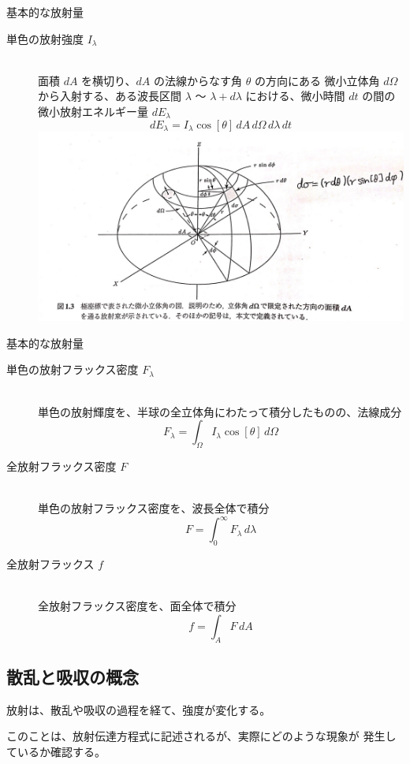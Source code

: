 \documentclass[unicode,colorlinks]{beamer}
\begin{document}
\begin{frame}{基本的な放射量}
	\begin{description}
		\item[単色の放射強度 $I_\lambda$]\leavevmode\\
			面積 $dA$ を横切り、$dA$ の法線からなす角 $\theta$ の方向にある
			微小立体角 $d\Omega$ から入射する、ある波長区間 $\lambda$ 〜
			$\lambda+d\lambda$ における、微小時間 $dt$ の間の微小放射エネルギー量
			$dE_\lambda$
			\[dE_\lambda=I_\lambda\cos[\theta]\,dA\,d\Omega\,d\lambda\,dt\]
			\includegraphics[width=\linewidth]{eq.jpg}
	\end{description}
\end{frame}

\begin{frame}{基本的な放射量}
	\begin{description}
		\item[単色の放射フラックス密度 $F_\lambda$]\leavevmode\\
			単色の放射輝度を、半球の全立体角にわたって積分したものの、法線成分
			\[F_\lambda=\int_\Omega I_\lambda\cos[\theta]\,d\Omega\]
		\item[全放射フラックス密度 $F$]\leavevmode\\
			単色の放射フラックス密度を、波長全体で積分
			\[F=\int^\infty_0 F_\lambda\,d\lambda\]
		\item[全放射フラックス $f$]\leavevmode\\
			全放射フラックス密度を、面全体で積分
			\[f=\int_AF\,dA\]
	\end{description}
\end{frame}

\begin{frame}
	\section{散乱と吸収の概念}
	放射は、散乱や吸収の過程を経て、強度が変化する。

	このことは、放射伝達方程式に記述されるが、実際にどのような現象が
	発生しているか確認する。
\end{frame}
\end{document}
